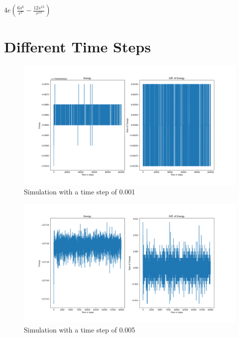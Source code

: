     $\displaystyle 4 e \left(\frac{6 s^{6}}{r^{7}} - \frac{12 s^{12}}{r^{13}}\right)$




\section{Different Time Steps}
\begin{figure}[!h]
	\begin{center}
		\includegraphics[scale=1]{Figure/plot_001.png}
	\end{center}
	\caption[Simulation]{Simulation with a time step of 0.001}
	\label{Plot001}
\end{figure}
\begin{figure}[!h]
	\begin{center}
		\includegraphics[scale= 1]{Figure/plot_005.png}
	\end{center}
	\caption[Simulation]{Simulation with a time step of 0.005}
	\label{Plot005}
\end{figure}

